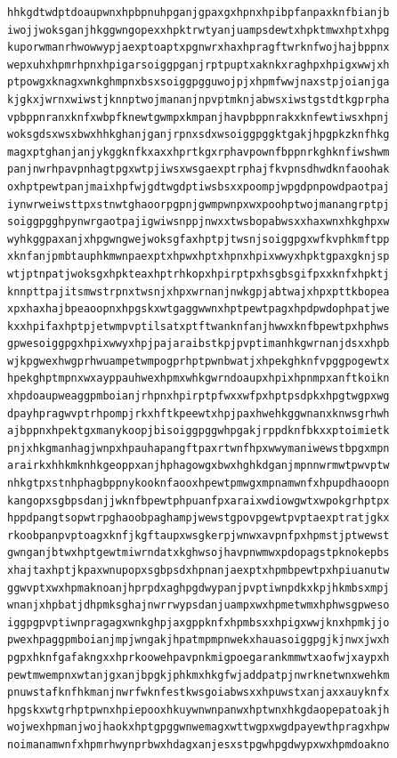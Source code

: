 \documentclass[11pt,letterpaper]{exam}
\begin{document}
\begin{questions}
\begin{verbatim}
hhkgdtwdptdoaupwnxhpbpnuhpganjgpaxgxhpnxhpibpfanpaxknfbianjb
iwojjwoksganjhkggwngopexxhpktrwtyanjuampsdewtxhpktmwxhptxhpg
kuporwmanrhwowwypjaexptoaptxpgnwrxhaxhpragftwrknfwojhajbppnx
wepxuhxhpmrhpnxhpigarsoiggpganjrptpuptxaknkxraghpxhpigxwwjxh
ptpowgxknagxwnkghmpnxbsxsoiggpgguwojpjxhpmfwwjnaxstpjoianjga
kjgkxjwrnxwiwstjknnptwojmananjnpvptmknjabwsxiwstgstdtkgprpha
vpbppnranxknfxwbpfknewtgwmpxkmpanjhavpbppnrakxknfewtiwsxhpnj
woksgdsxwsxbwxhhkghanjganjrpnxsdxwsoiggpggktgakjhpgpkzknfhkg
magxptghanjanjykggknfkxaxxhprtkgxrphavpownfbppnrkghknfiwshwm
panjnwrhpavpnhagtpgxwtpjiwsxwsgaexptrphajfkvpnsdhwdknfaoohak
oxhptpewtpanjmaixhpfwjgdtwgdptiwsbsxxpoompjwpgdpnpowdpaotpaj
iynwrweiwsttpxstnwtghaoorpgpnjgwmpwnpxwxpoohptwojmanangrptpj
soiggpgghpynwrgaotpajigwiwsnppjnwxxtwsbopabwsxxhaxwnxhkghpxw
wyhkggpaxanjxhpgwngwejwoksgfaxhptpjtwsnjsoiggpgxwfkvphkmftpp
xknfanjpmbtauphkmwnpaexptxhpwxhptxhpnxhpixwwyxhpktgpaxgknjsp
wtjptnpatjwoksgxhpkteaxhptrhkopxhpirptpxhsgbsgifpxxknfxhpktj
knnpttpajitsmwstrpnxtwsnjxhpxwrnanjnwkgpjabtwajxhpxpttkbopea
xpxhaxhajbpeaoopnxhpgskxwtgaggwwnxhptpewtpagxhpdpwdophpatjwe
kxxhpifaxhptpjetwmpvptilsatxptftwanknfanjhwwxknfbpewtpxhphws
gpwesoiggpgxhpixwwyxhpjpajaraibstkpjpvptimanhkgwrnanjdsxxhpb
wjkpgwexhwgprhwuampetwmpogprhptpwnbwatjxhpekghknfvpggpogewtx
hpekghptmpnxwxayppauhwexhpmxwhkgwrndoaupxhpixhpnmpxanftkoikn
xhpdoaupweaggpmboianjrhpnxhpirptpfwxxwfpxhptpsdpkxhpgtwgpxwg
dpayhpragwvptrhpompjrkxhftkpeewtxhpjpaxhwehkggwnanxknwsgrhwh
ajbppnxhpektgxmanykoopjbisoiggpggwhpgakjrppdknfbkxxptoimietk
pnjxhkgmanhagjwnpxhpauhapangftpaxrtwnfhpxwwymaniwewstbpgxmpn
arairkxhhkmknhkgeoppxanjhphagowgxbwxhghkdganjmpnnwrmwtpwvptw
nhkgtpxstnhphagbppnykooknfaooxhpewtpmwgxmpnamwnfxhpupdhaoopn
kangopxsgbpsdanjjwknfbpewtphpuanfpxaraixwdiowgwtxwpokgrhptpx
hppdpangtsopwtrpghaoobpaghampjwewstgpovpgewtpvptaexptratjgkx
rkoobpanpvptoagxknfjkgftaupxwsgkerpjwnwxavpnfpxhpmstjptwewst
gwnganjbtwxhptgewtmiwrndatxkghwsojhavpnwmwxpdopagstpknokepbs
xhajtaxhptjkpaxwnupopxsgbpsdxhpnanjaexptxhpmbpewtpxhpiuanutw
ggwvptxwxhpmaknoanjhprpdxaghpgdwypanjpvptiwnpdkxkpjhkmbsxmpj
wnanjxhpbatjdhpmksghajnwrrwypsdanjuampxwxhpmetwmxhphwsgpweso
iggpgpvptiwnpragagxwnkghpjaxgppknfxhpmbsxxhpigxwwjknxhpmkjjo
pwexhpaggpmboianjmpjwngakjhpatmpmpnwekxhauasoiggpgjkjnwxjwxh
pgpxhknfgafakngxxhprkoowehpavpnkmigpoegarankmmwtxaofwjxaypxh
pewtmwempnxwtanjgxanjbpgkjphkmxhkgfwjaddpatpjnwrknetwnxwehkm
pnuwstafknfhkmanjnwrfwknfestkwsgoiabwsxxhpuwstxanjaxxauyknfx
hpgskxwtgrhptpwnxhpiepooxhkuywnwnpanwxhptwnxhkgdaopepatoakjh
wojwexhpmanjwojhaokxhptgpggwnwemagxwttwgpxwgdpayewthpragxhpw
noimanamwnfxhpmrhwynprbwxhdagxanjesxstpgwhpgdwypxwxhpmdoakno

\end{verbatim}
\end{questions}
\end{document}
